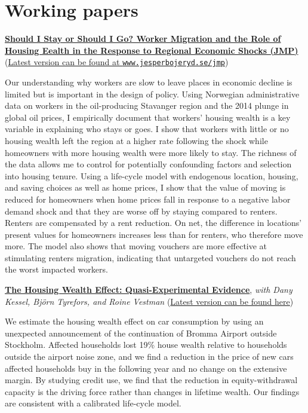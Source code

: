 \documentclass{clean_cv}
\begin{document}
\section{Working papers}


\href{https://www.jesperbojeryd.se/jmp}{\textbf{Should I Stay or Should I Go? Worker Migration and the Role of Housing Eealth in the Response to Regional Economic Shocks (JMP)}} (\href{https://www.jesperbojeryd.se/jmp}{Latest version can be found at \texttt{www.jesperbojeryd.se/jmp}})

Our understanding why workers are slow to leave places in economic decline is limited but is important in the design of policy. Using Norwegian administrative data on workers in the oil-producing Stavanger region and the 2014 plunge in global oil prices, I empirically document that workers' housing wealth is a key variable in explaining who stays or goes. I show that workers with little or no housing wealth left the region at a higher rate following the shock while homeowners with more housing wealth were more likely to stay. The richness of the data allows me to control for potentially confounding factors and selection into housing tenure. Using a life-cycle model with endogenous location, housing, and saving choices as well as home prices, I show that the value of moving is reduced for homeowners when home prices fall in response to a negative labor demand shock and that they are worse off by staying compared to renters. Renters are compensated by a rent reduction. On net, the difference in locations' present values for homeowners increases less than for renters, who therefore move more. The model also shows that moving vouchers are more effective at stimulating renters migration, indicating that untargeted vouchers do not reach the worst impacted workers.

\medskip

\Needspace{4cm}
\href{https://roinevestman.com/wp-content/uploads/2023/03/DP18034-compressed.pdf}{\textbf{The Housing Wealth Effect: Quasi-Experimental Evidence}}, \emph{with Dany Kessel, Björn Tyrefors, and Roine Vestman} (\href{https://roinevestman.com/wp-content/uploads/2023/03/DP18034-compressed.pdf}{Latest version can be found \underline{here}})

We estimate the housing wealth effect on car consumption by using an unexpected announcement of the continuation of Bromma Airport outside Stockholm. Affected households lost 19\% house wealth relative to households outside the airport noise zone, and we find a reduction in the price of new cars affected households buy in the following year and no change on the extensive margin. By studying credit use, we find that the reduction in equity-withdrawal capacity is the driving force rather than changes in lifetime wealth. Our findings are consistent with a calibrated life-cycle model.
\end{document}
